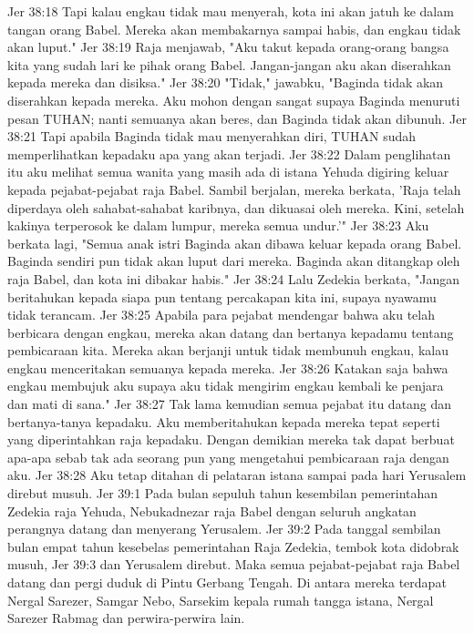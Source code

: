 Jer 38:18  Tapi kalau engkau tidak mau menyerah, kota ini akan jatuh ke dalam tangan orang Babel. Mereka akan membakarnya sampai habis, dan engkau tidak akan luput."
Jer 38:19  Raja menjawab, "Aku takut kepada orang-orang bangsa kita yang sudah lari ke pihak orang Babel. Jangan-jangan aku akan diserahkan kepada mereka dan disiksa."
Jer 38:20  "Tidak," jawabku, "Baginda tidak akan diserahkan kepada mereka. Aku mohon dengan sangat supaya Baginda menuruti pesan TUHAN; nanti semuanya akan beres, dan Baginda tidak akan dibunuh.
Jer 38:21  Tapi apabila Baginda tidak mau menyerahkan diri, TUHAN sudah memperlihatkan kepadaku apa yang akan terjadi.
Jer 38:22  Dalam penglihatan itu aku melihat semua wanita yang masih ada di istana Yehuda digiring keluar kepada pejabat-pejabat raja Babel. Sambil berjalan, mereka berkata, 'Raja telah diperdaya oleh sahabat-sahabat karibnya, dan dikuasai oleh mereka. Kini, setelah kakinya terperosok ke dalam lumpur, mereka semua undur.'"
Jer 38:23  Aku berkata lagi, "Semua anak istri Baginda akan dibawa keluar kepada orang Babel. Baginda sendiri pun tidak akan luput dari mereka. Baginda akan ditangkap oleh raja Babel, dan kota ini dibakar habis."
Jer 38:24  Lalu Zedekia berkata, "Jangan beritahukan kepada siapa pun tentang percakapan kita ini, supaya nyawamu tidak terancam.
Jer 38:25  Apabila para pejabat mendengar bahwa aku telah berbicara dengan engkau, mereka akan datang dan bertanya kepadamu tentang pembicaraan kita. Mereka akan berjanji untuk tidak membunuh engkau, kalau engkau menceritakan semuanya kepada mereka.
Jer 38:26  Katakan saja bahwa engkau membujuk aku supaya aku tidak mengirim engkau kembali ke penjara dan mati di sana."
Jer 38:27  Tak lama kemudian semua pejabat itu datang dan bertanya-tanya kepadaku. Aku memberitahukan kepada mereka tepat seperti yang diperintahkan raja kepadaku. Dengan demikian mereka tak dapat berbuat apa-apa sebab tak ada seorang pun yang mengetahui pembicaraan raja dengan aku.
Jer 38:28  Aku tetap ditahan di pelataran istana sampai pada hari Yerusalem direbut musuh.
Jer 39:1  Pada bulan sepuluh tahun kesembilan pemerintahan Zedekia raja Yehuda, Nebukadnezar raja Babel dengan seluruh angkatan perangnya datang dan menyerang Yerusalem.
Jer 39:2  Pada tanggal sembilan bulan empat tahun kesebelas pemerintahan Raja Zedekia, tembok kota didobrak musuh,
Jer 39:3  dan Yerusalem direbut. Maka semua pejabat-pejabat raja Babel datang dan pergi duduk di Pintu Gerbang Tengah. Di antara mereka terdapat Nergal Sarezer, Samgar Nebo, Sarsekim kepala rumah tangga istana, Nergal Sarezer Rabmag dan perwira-perwira lain.
